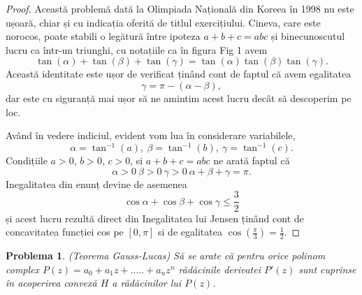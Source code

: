 \documentclass[a4paper,12pt,oneside]{report}
\newtheorem{problem}{Problema}
\begin{document}
\begin{proof}
Această problemă dată la Olimpiada Națională din Koreea în 1998 nu este ușoară, chiar și cu indicația oferită de titlul exercițiului. Cineva, care este norocos, poate stabili o legătură între  ipoteza \(a + b + c = abc\) și binecunoscutul lucru ca într-un triunghi, cu notațiile  ca în figura Fig 1
 avem
 \begin{displaymath}
   \tan\left ( \alpha  \right ) + \tan\left ( \beta   \right ) + \tan\left ( \gamma   \right ) = \tan\left ( \alpha  \right )\tan\left ( \beta   \right )\tan\left ( \gamma   \right ).
 \end{displaymath}
Această identitate este ușor de verificat ținând cont de faptul că avem egalitatea \[\gamma  = \pi  - \left ( \alpha  - \beta  \right ),\] dar este cu siguranță mai ușor să ne amintim acest lucru decât să descoperim pe loc.

Având în vedere indiciul, evident vom lua în considerare variabilele,  \[\alpha  = \tan^{-1}\left ( a \right ),~ \beta = \tan ^{-1}\left ( b \right ),~\gamma  = \tan ^{-1}\left ( c \right ).\]
Condițiile \(a> 0\), \(b> 0\), \(c> 0\), si \(a+b+c = abc\) ne arată faptul că \[\alpha > 0 ~\beta > 0~\gamma > 0~\alpha + \beta + \gamma  = \pi.\] Inegalitatea din enunț devine de asemenea \[\cos \alpha  + \cos \beta  + \cos \gamma  \leq \frac{3}{2}\] și acest lucru rezultă direct din Inegalitatea lui Jensen  ținând cont de  concavitatea funcției cos
 pe \(\left [ 0 , \pi  \right ]\)  si de egalitatea \(\cos \left ( \frac{\pi }{3} \right ) = \frac{1}{2}\).
\end{proof}
\begin{problem} (Teorema Gauss-Lucas)
Să se arate că pentru orice polinom complex \(P\left ( z \right ) = a_{0} + a_{1}z + ..... +a_{n}z^{n}\) rădăcinile derivatei \({P}'\left ( z \right )\) sunt cuprinse în acoperirea convexă \(H\) a rădăcinilor lui \(P\left ( z \right )\).
\end{problem}
\end{document}
